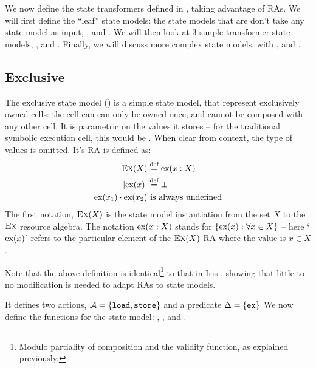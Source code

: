 We now define the state transformers defined in \cite{sacha-phd}, taking advantage of RAs. We will first define the ``leaf'' state models: the state models that are don't take any state model as input, \Ex, \Ag{} and \Frac. We will then look at 3 simple transformer state models, \Sum, \Product{} and \PProduct{}. Finally, we will discuss more complex state models, with \Freeable, \PMap{} and \List.

\subsection{Exclusive}

The exclusive state model \Ex{}(\Val) is a simple state model, that represent exclusively owned cells: the cell can can only be owned once, and cannot be composed with any other cell. It is parametric on the values it stores -- for the traditional symbolic execution cell, this would be . When clear from context, the type of values is omitted. It's RA is defined as: \begin{align*}
 	\textsc{Ex}(X) &\stackrel{\textnormal{def}}=	\text{ex}(x: X)\\
 	|\text{ex}(x)| &\stackrel{\textnormal{def}}= \bot\\
 	\text{ex}(x_1) \cdot \text{ex}(x_2)&~\text{is always undefined}
 \end{align*}
The first notation, $\textsc{Ex}(X)$ is the state model instantiation from the set $X$ to the $\textsc{Ex}$ resource algebra. The notation $\text{ex}(x:X)$ stands for $\{\text{ex}(x) : \forall x\in X \}$ -- here `$\text{ex}(x)$' refers to the particular element of the $\textsc{Ex}(X)$ RA where the value is $x\in X$.
 
 Note that the above definition is identical\footnote{Modulo partiality of composition and the validity function, as explained previously.} to that in Iris \cite{iris}, showing that little to no modification is needed to adapt RAs to state models.

It defines two actions, ${\cal{A}}=\{\texttt{load}, \texttt{store}\}$ and a predicate $\Delta=\{\texttt{ex}\}$  We now define the functions for the state model: \execac, \produce, \consume{} and \fix.

